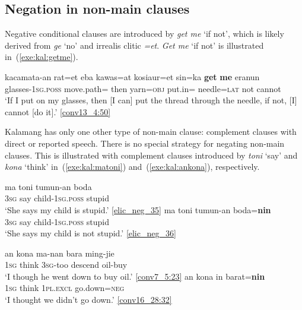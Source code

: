 \documentclass[output=paper,colorlinks,citecolor=brown,draft]{langscibook}
\begin{document}
\subsection{Negation in non-main clauses}
\label{sec:nonmainneg}
Negative conditional clauses are introduced by \textit{get me} `if not', which is likely derived from \textit{ge} `no' and irrealis clitic \textit{=et}. \textit{Get me} `if not' is illustrated in~(\ref{exe:kal:getme}).

\ea	\label{exe:kal:getme}
\gll kacamata-an rat=et eba kawas=at kosiaur=et sin=ka \textbf{get} \textbf{me} eranun\\
glasses-\textsc{1sg.poss} move.path={\glet} then yarn=\textsc{obj}  put.in={\glet} needle=\textsc{lat} not {\glme} cannot\\
\glt `If I put on my glasses, then [I can] put the thread through the needle, if not, [I] cannot [do it].' {\href{http://hdl.handle.net/10050/00-0000-0000-0004-1BA6-6}{[conv13\_4:50]}}
\z

Kalamang has only one other type of non-main clause: complement clauses with direct or reported speech. There is no special strategy for negating non-main clauses. This is illustrated with complement clauses introduced by \textit{toni} `say' and \textit{kona} `think' in~(\ref{exe:kal:matoni}) and~(\ref{exe:kal:ankona}), respectively.

\ea \label{exe:kal:matoni}
\ea \gll ma toni tumun-an boda\\
\textsc{3sg} say child-\textsc{1sg.poss} stupid\\
\glt `She says my child is stupid.' {\href{http://hdl.handle.net/10050/00-0000-0000-0004-1C60-A}{[elic\_neg\_35]}}
\ex \gll ma toni tumun-an boda=\textbf{nin}\\
\textsc{3sg} say child-\textsc{1sg.poss} stupid\\
\glt `She says my child is not stupid.' {\href{http://hdl.handle.net/10050/00-0000-0000-0004-1C60-A}{[elic\_neg\_36]}}
\z \z


\ea \label{exe:kal:ankona}
\ea \gll an kona ma-nan bara ming-jie\\
\textsc{1sg} think \textsc{3sg}-too descend oil-buy\\
\glt `I though he went down to buy oil.' {\href{http://hdl.handle.net/10050/00-0000-0000-0004-1BC3-B}{[conv7\_5:23]}}
\ex \gll an kona in barat=\textbf{nin}\\
\textsc{1sg} think \textsc{1pl.excl} go.down=\textsc{neg}\\
\glt `I thought we didn't go down.' {\href{http://hdl.handle.net/10050/00-0000-0000-0004-1BA4-1}{[conv16\_28:32]}}
\z \z
\end{document}
